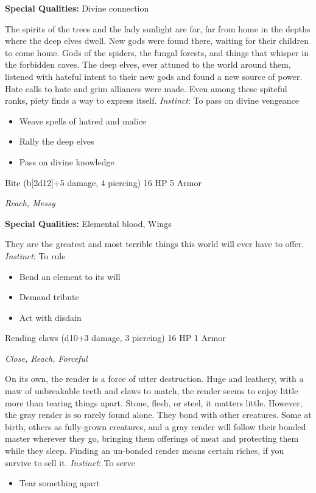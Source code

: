 \textbf{Special Qualities:}
Divine connection

\HRule
The spirits of the trees and the lady sunlight are far, far from home in the depths where the deep elves dwell. New gods were found there, waiting for their children to come home. Gods of the spiders, the fungal forests, and things that whisper in the forbidden caves. The deep elves, ever attuned to the world around them, listened with hateful intent to their new gods and found a new source of power. Hate calls to hate and grim alliances were made. Even among these spiteful ranks, piety finds a way to express itself. \emph{Instinct}: To pass on divine vengeance
\begin{itemize}
\item Weave spells of hatred and malice
\item Rally the deep elves
\item Pass on divine knowledge
\end{itemize}

\HRule
{}

Bite (b[2d12]+5 damage, 4 piercing)\hspace*{\fill} 16 HP 5 Armor

\emph{Reach, Messy}

\textbf{Special Qualities:}
Elemental blood, Wings

\HRule
They are the greatest and most terrible things this world will ever have to offer. \emph{Instinct}: To rule
\begin{itemize}
\item Bend an element to its will
\item Demand tribute
\item Act with disdain
\end{itemize}

\HRule
{}

Rending claws (d10+3 damage, 3 piercing)\hspace*{\fill} 16 HP 1 Armor

\emph{Close, Reach, Forceful}

\HRule
On its own, the render is a force of utter destruction. Huge and leathery, with a maw of unbreakable teeth and claws to match, the render seems to enjoy little more than tearing things apart. Stone, flesh, or steel, it matters little. However, the gray render is so rarely found alone. They bond with other creatures. Some at birth, others as fully-grown creatures, and a gray render will follow their bonded master wherever they go, bringing them offerings of meat and protecting them while they sleep. Finding an un-bonded render means certain riches, if you survive to sell it. \emph{Instinct}: To serve
\begin{itemize}
\item Tear something apart
\end{itemize}
\newpage
\HRule
{}


